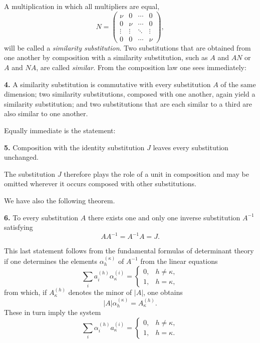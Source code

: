 \documentclass[11pt]{article}
\begin{document}
\medskip
A multiplication in which all multipliers are equal,
\[
N=
\begin{pmatrix}
\nu & 0 & \cdots & 0\\
0 & \nu & \cdots & 0\\
\vdots & \vdots & \ddots & \vdots\\
0 & 0 & \cdots & \nu
\end{pmatrix},
\]
will be called a \emph{similarity substitution}. Two substitutions that are obtained from one another by composition with a similarity substitution, such as \(A\) and \(AN\) or \(A\) and \(NA\), are called \emph{similar}. From the composition law one sees immediately:

\medskip
\noindent\textbf{4.}
A similarity substitution is commutative with every substitution \(A\) of the same dimension; two similarity substitutions, composed with one another, again yield a similarity substitution; and two substitutions that are each similar to a third are also similar to one another.

\medskip
Equally immediate is the statement:

\medskip
\noindent\textbf{5.}
Composition with the identity substitution \(J\) leaves every substitution unchanged.

\medskip
The substitution \(J\) therefore plays the role of a unit in composition and may be omitted wherever it occurs composed with other substitutions.

We have also the following theorem.

\medskip
\noindent\textbf{6.}
To every substitution \(A\) there exists one and only one inverse substitution \(A^{-1}\) satisfying
\[
AA^{-1}=A^{-1}A=J.
\tag{15}
\]

\medskip
This last statement follows from the fundamental formulas of determinant theory if one determines the elements \(\alpha^{(\kappa)}_h\) of \(A^{-1}\) from the linear equations
\[
\sum_i a^{(h)}_i\alpha^{(i)}_\kappa=
\begin{cases}
0,& h\ne \kappa,\\
1,& h=\kappa,
\end{cases}
\tag{16}
\]
from which, if \(A^{(h)}_\kappa\) denotes the minor of \(|A|\), one obtains
\[
|A|\alpha^{(\kappa)}_h=A^{(h)}_\kappa.
\tag{17}
\]
These in turn imply the system
\[
\sum_i \alpha^{(h)}_i a^{(i)}_\kappa=
\begin{cases}
0,& h\ne \kappa,\\
1,& h=\kappa.
\end{cases}
\tag{18}
\]
\end{document}

